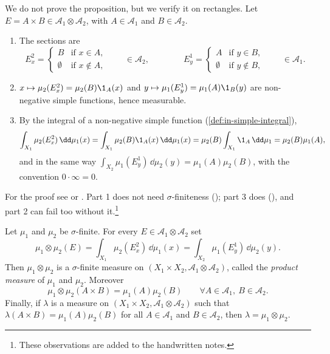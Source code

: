 We do not prove the proposition, but we verify it on rectangles. Let
$E=A\times B\in\mathcal A_1\otimes\mathcal A_2$, with $A\in\mathcal A_1$ and $B\in\mathcal A_2$.
\begin{enumerate}[label=\arabic*)]
  \item The sections are
    \[
      E^2_x=\begin{cases}B&\text{if }x\in A,\\ \emptyset&\text{if }x\notin A,\end{cases}
      \qquad\in\mathcal A_2,
      \qquad\qquad
      E^1_y=\begin{cases}A&\text{if }y\in B,\\ \emptyset&\text{if }y\notin B,\end{cases}
      \qquad\in\mathcal A_1 .
    \]
  \item $x\mapsto\mu_2(E^2_x)=\mu_2(B)\1_A(x)$ and $y\mapsto\mu_1(E^1_y)=\mu_1(A)\1_B(y)$ are
    non-negative simple functions, hence measurable.
  \item By the integral of a non-negative simple function (\cref{def:in-simple-integral}),
    \[
      \int_{X_1}\mu_2(E^2_x)\,\dd\mu_1(x)=\int_{X_1}\mu_2(B)\1_A(x)\,\dd\mu_1(x)
      =\mu_2(B)\int_{X_1}\1_A\,\dd\mu_1=\mu_2(B)\mu_1(A),
    \]
    and in the same way $\int_{X_2}\mu_1(E^1_y)\,\dd\mu_2(y)=\mu_1(A)\mu_2(B)$, with the
    convention $0\cdot\infty=0$.
\end{enumerate}
For the proof see \citet[Theorem~18.1(i) and the proof of Theorem~18.2]{billingsley} or
\citet[Chapter~8, up to Theorem~8.6]{rudin-rca}. Part 1 does not need $\sigma$-finiteness
(); part 3 does (), and part 2 can fail
too without it.\footnote{These observations are added to the handwritten notes.}

\begin{theorem}\label{thm:pm-product-measure}
Let $\mu_1$ and $\mu_2$ be $\sigma$-finite. For every $E\in\mathcal A_1\otimes\mathcal A_2$ set
\[
  \mu_1\otimes\mu_2(E)=\int_{X_1}\mu_2(E^2_x)\,\dd\mu_1(x)=\int_{X_2}\mu_1(E^1_y)\,\dd\mu_2(y).
\]
Then $\mu_1\otimes\mu_2$ is a $\sigma$-finite measure on
$(X_1\times X_2,\mathcal A_1\otimes\mathcal A_2)$, called the \emph{product measure} of
$\mu_1$ and $\mu_2$. Moreover
\[
  \mu_1\otimes\mu_2(A\times B)=\mu_1(A)\mu_2(B)\qquad\forall A\in\mathcal A_1,\ B\in\mathcal A_2 .
\]
Finally, if $\lambda$ is a measure on $(X_1\times X_2,\mathcal A_1\otimes\mathcal A_2)$ such
that $\lambda(A\times B)=\mu_1(A)\mu_2(B)$ for all $A\in\mathcal A_1$ and $B\in\mathcal A_2$,
then $\lambda=\mu_1\otimes\mu_2$.
\end{theorem}


